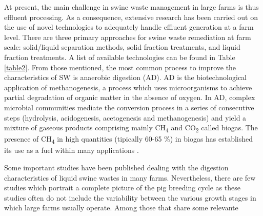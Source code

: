 At present, the main challenge in swine waste management in large farms is thus effluent processing. As a consequence, extensive research has been carried out on the use of novel technologies to adequately handle effluent generation at a farm level. There are three primary approaches for swine waste remediation at farm scale: solid/liquid separation methods, solid fraction treatments, and liquid fraction treatments. A list of available technologies can be found in Table \ref{table2}. From those mentioned, the most common process to improve the characteristics of SW is anaerobic digestion (AD). AD is the biotechnological application of methanogenesis, a process which uses microorganisms to achieve partial degradation of organic matter in the absence of oxygen. In AD, complex microbial communities mediate the conversion process in a series of consecutive steps (hydrolysis, acidogenesis, acetogenesis and methanogenesis) and yield a mixture of gaseous products comprising mainly CH\textsubscript{4} and CO\textsubscript{2} called biogas. The presence of CH\textsubscript{4} in high quantities (tipically 60-65 \%) in biogas has established its use as a fuel within many applications \cite{Mata_Alvarez_2014,O_Flaherty_2010}.

Some important studies have been published dealing with the digestion characteristics of liquid swine wastes in many farms. Nevertheless, there are few studies which portrait a complete picture of the pig breeding cycle as these studies often do not include the variability between the various growth stages in which large farms usually operate. Among those that share some relevante